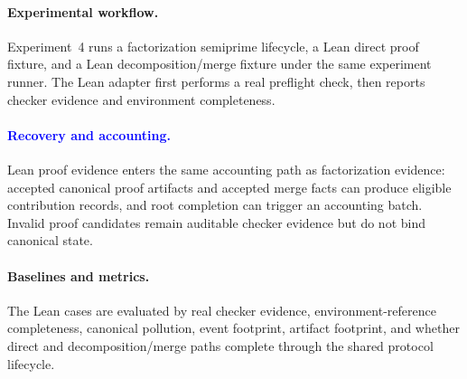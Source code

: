 \documentclass{article}
\theoremstyle{plain}
\begin{document}
{\paragraph{Experimental workflow.}
{\color{blue}
Experiment~4 runs a factorization semiprime lifecycle, a Lean direct proof fixture, and a Lean decomposition/merge fixture under the same experiment runner. The Lean adapter first performs a real preflight check, then reports checker evidence and environment completeness.
}


\paragraph{\textcolor{blue}{Recovery and accounting.}}
{\color{blue}
Lean proof evidence enters the same accounting path as factorization evidence: accepted canonical proof artifacts and accepted merge facts can produce eligible contribution records, and root completion can trigger an accounting batch. Invalid proof candidates remain auditable checker evidence but do not bind canonical state.
}

\paragraph{Baselines and metrics.}
{\color{blue}
The Lean cases are evaluated by real checker evidence, environment-reference completeness, canonical pollution, event footprint, artifact footprint, and whether direct and decomposition/merge paths complete through the shared protocol lifecycle.
}



}
\begingroup
\color{blue}
\small
\renewcommand{\arraystretch}{1.12}
\providecommand{\FloatBarrier}{}
\providecommand{\TS}{TokenShare}
\providecommand{\tickyes}{\(\checkmark\)}
\providecommand{\tickno}{--}


\makeatletter
\let\TSoldmakecaption\@makecaption
\renewcommand{\@makecaption}[2]{%
  \vskip\abovecaptionskip
  \sbox\@tempboxa{{\color{blue}\small #1: #2}}%
  \ifdim \wd\@tempboxa >\hsize
    {\color{blue}\small #1: #2\par}%
  \else
    \global\@minipagefalse
    \hb@xt@\hsize{\hfil\box\@tempboxa\hfil}%
  \fi
  \vskip\belowcaptionskip}
\makeatother
\end{document}
